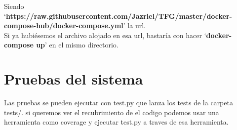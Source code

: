 Siendo `\textbf{https://raw.githubusercontent.com/Jazriel/TFG/master/docker-compose-hub/docker-compose.yml}' la url.
\hphantom{sin esto quedaba mal}\\

Si ya hubiésemos el archivo alojado en esa url, bastaría con hacer `\textbf{docker-compose up}' en el mismo directorio.

\section{Pruebas del sistema}

Las pruebas se pueden ejecutar con test.py que lanza los tests de la carpeta tests/. si queremos ver el recubrimiento de el codigo podemos usar una herramienta como coverage y ejecutar test.py a traves de esa herramienta.  



